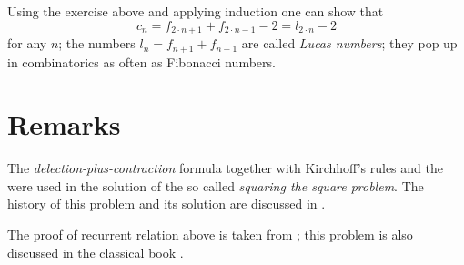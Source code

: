 Using the exercise above and applying induction one can show that 
\[c_n=f_{2\cdot n+1}+f_{2\cdot n-1}-2=l_{2\cdot  n}-2\]
for any $n$;
the numbers $l_n=f_{n+1}+f_{n-1}$ are called \emph{Lucas numbers};
they pop up in combinatorics as often as Fibonacci numbers.  

\section*{Remarks}

The \emph{delection-plus-contraction} formula together with Kirchhoff's rules and the were used in the solution of the so called  \emph{squaring the square problem}.
The history of this problem and its solution are discussed in \cite[Chapter 17]{gardner}.

The proof of recurrent relation above is taken from \cite{haghighi-bibak};
this problem is also discussed in the classical book \cite{knut}.
